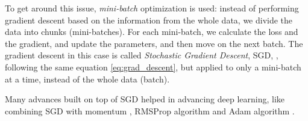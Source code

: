 \par To get around this issue, \textit{mini-batch} optimization is used: instead of performing gradient descent based on the information from the whole data, we divide the data into chunks (mini-batches). For each mini-batch, we calculate the loss and the gradient, and update the parameters, and then move on the next batch. The gradient descent in this case is called \textit{Stochastic Gradient Descent}, SGD, \citep{robbins1951stochastic}, following the same equation \ref{eq:grad_descent}, but applied to only a mini-batch at a time, instead of the whole data (batch).

\par Many advances built on top of SGD helped in advancing deep learning, like combining SGD with momentum \citep{rumelhart1988learning}, RMSProp algorithm \citep{hinton2012neural} and Adam algorithm \citep{kingma2014adam}.

%
%
%
%

